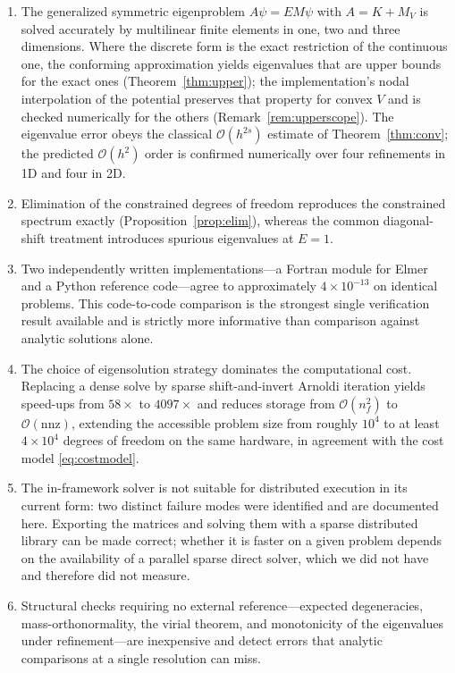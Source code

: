 \documentclass[pdflatex,sn-mathphys-num]{sn-jnl}
\theoremstyle{thmstyleone}%
\theoremstyle{thmstyletwo}%
\theoremstyle{thmstylethree}%
\begin{document}
\begin{enumerate}
  \item The generalized symmetric eigenproblem $A\psi = EM\psi$ with
        $A = K + M_V$ is solved accurately by multilinear finite elements in one,
        two and three dimensions. Where the discrete form is the exact
        restriction of the continuous one, the conforming approximation yields
        eigenvalues that are upper bounds for the exact ones
        (Theorem~\ref{thm:upper}); the implementation's nodal interpolation of
        the potential preserves that property for convex $V$ and is checked
        numerically for the others (Remark~\ref{rem:upperscope}). The eigenvalue
        error obeys the classical $\mathcal{O}(h^{2s})$ estimate
        of Theorem~\ref{thm:conv}; the predicted $\mathcal{O}(h^2)$ order is
        confirmed numerically over four refinements in 1D and four in 2D.
  \item Elimination of the constrained degrees of freedom reproduces the
        constrained spectrum exactly (Proposition~\ref{prop:elim}), whereas the
        common diagonal-shift treatment introduces spurious eigenvalues at
        $E = 1$.
  \item Two independently written implementations---a Fortran module for
        \textsf{Elmer} and a Python reference code---agree to approximately
        $4\times10^{-13}$ on identical problems. This code-to-code comparison is the
        strongest single verification result available and is strictly more
        informative than comparison against analytic solutions alone.
  \item The choice of eigensolution strategy dominates the computational cost.
        Replacing a dense solve by sparse shift-and-invert Arnoldi iteration
        yields speed-ups from $58\times$ to $4097\times$ and reduces storage from
        $\mathcal{O}(n_f^2)$ to $\mathcal{O}(\mathrm{nnz})$, extending the
        accessible problem size from roughly $10^4$ to at least
        $4\times10^4$ degrees of freedom on the same hardware, in agreement with
        the cost model \eqref{eq:costmodel}.
  \item The in-framework solver is not suitable for distributed execution in its
        current form: two distinct failure modes were identified and are
        documented here. Exporting the matrices and solving them with a sparse
        distributed library can be made correct; whether it is faster on a given
        problem depends on the availability of a parallel sparse direct solver,
        which we did not have and therefore did not measure.
  \item Structural checks requiring no external reference---expected
        degeneracies, mass-orthonormality, the virial theorem, and monotonicity
        of the eigenvalues under refinement---are inexpensive and detect errors
        that analytic comparisons at a single resolution can miss.
\end{enumerate}
\end{document}
